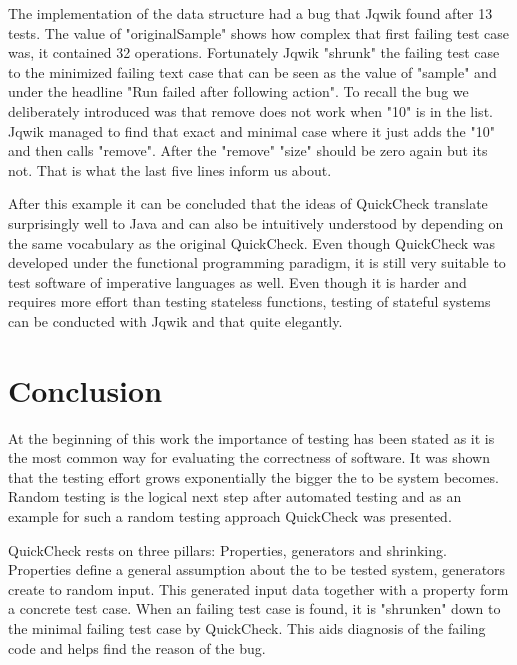 \documentclass[a4paper, 12pt]{article} %
\begin{document}
The implementation of the data structure had a bug that Jqwik found after 13 tests. The value of "originalSample" shows how complex that first failing test case was, it contained 32 operations. Fortunately Jqwik "shrunk" the failing test case to the minimized failing text case that can be seen as the value of "sample" and under the headline "Run failed after following action". To recall the bug we deliberately introduced was that remove does not work when "10" is in the list. Jqwik managed to find that exact and minimal case where it just adds the "10" and then calls "remove". After the "remove" "size" should be zero again but its not. That is what the last five lines inform us about.

After this example it can be concluded that the ideas of QuickCheck translate surprisingly well to Java and can also be intuitively understood by depending on the same vocabulary as the original QuickCheck. Even though QuickCheck was developed under the functional programming paradigm, it is still very suitable to test software of imperative languages as well. Even though it is harder and requires more effort than testing stateless functions, testing of stateful systems can be conducted with Jqwik and that quite elegantly.

\section{Conclusion}


At the beginning of this work the importance of testing has been stated as it is the most common way for evaluating the correctness of software. It was shown that the testing effort grows exponentially the bigger the to be system becomes. Random testing is the logical next step after automated testing and as an example for such a random testing approach QuickCheck was presented.  


QuickCheck rests on three pillars: Properties, generators and shrinking. Properties define a general assumption about the to be tested system, generators create to random input. This generated input data together with a property form a concrete test case. When an failing test case is found, it is "shrunken" down to the minimal failing test case by QuickCheck. This aids diagnosis of the failing code and helps find the reason of the bug. 

\end{document}
